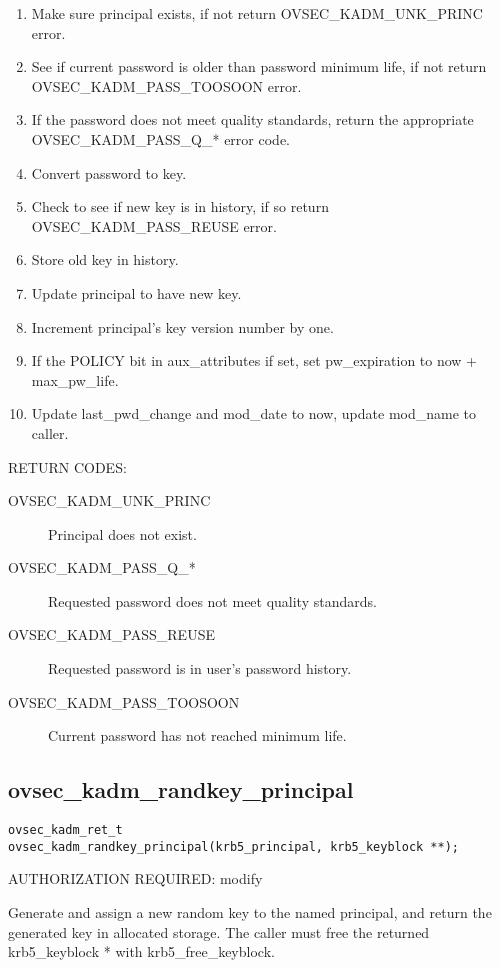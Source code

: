 \begin{enumerate}
\item Make sure principal exists, if not return OVSEC_KADM_UNK_PRINC error.
\item See if current password is older than password minimum life,
if not return OVSEC_KADM_PASS_TOOSOON error.
\item If the password does not meet quality standards, return the
appropriate OVSEC_KADM_PASS_Q_* error code.
\item Convert password to key.
\item Check to see if new key is in history, if so return
OVSEC_KADM_PASS_REUSE error.
\item Store old key in history.
\item Update principal to have new key.
\item Increment principal's key version number by one.
\item If the POLICY bit in aux_attributes if set, set pw_expiration to
now + max_pw_life.
\item Update last_pwd_change and mod_date to now, update mod_name to
caller.
\end{enumerate}

RETURN CODES:

\begin{description}
\item[OVSEC_KADM_UNK_PRINC] Principal does not exist.
\item[OVSEC_KADM_PASS_Q_*] Requested password does not meet quality
standards. 
\item[OVSEC_KADM_PASS_REUSE] Requested password is in user's
password history. 
\item[OVSEC_KADM_PASS_TOOSOON] Current password has not reached minimum
life. 
\end{description}

\subsection{ovsec_kadm_randkey_principal}

\begin{verbatim}
ovsec_kadm_ret_t
ovsec_kadm_randkey_principal(krb5_principal, krb5_keyblock **);
\end{verbatim}

AUTHORIZATION REQUIRED: modify

Generate and assign a new random key to the named principal, and
return the generated key in allocated storage.  The caller must free
the returned krb5_keyblock * with krb5_free_keyblock.

